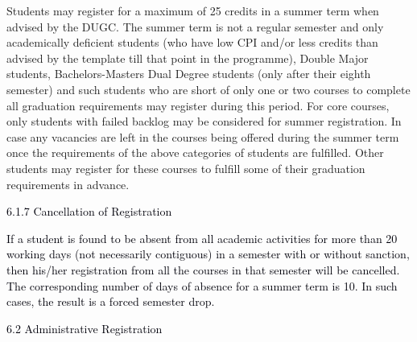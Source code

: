 \documentclass[12pt]{article}
\begin{document}
\vspace{\baselineskip}
\begin{justify}
{\fontsize{10pt}{12.0pt}\selectfont Students may register for a maximum of 25 credits in a summer term when advised by the DUGC. The summer term is not a regular semester and only academically deficient students (who have low CPI and/or less credits than advised by the template till that point in the programme), Double Major students, Bachelors-Masters Dual Degree students (only after their eighth semester) and such students who are short of only one or two courses to complete all graduation requirements may register during this period. For core courses, only students with failed backlog may be considered for summer registration. In case any vacancies are left in the courses being offered during the summer term once the requirements of the above categories of students are fulfilled. Other students may register for these courses to fulfill some of their graduation requirements in advance.\par}
\end{justify}\par


\vspace{\baselineskip}
{\fontsize{10pt}{12.0pt}\selectfont \textcolor[HTML]{00000A}{6.1.7 Cancellation of Registration}\par}\par


\vspace{\baselineskip}
\begin{adjustwidth}{0.0in}{0.01in}
\begin{justify}
{\fontsize{9pt}{10.8pt}\selectfont \textcolor[HTML]{00000A}{If a student is found to be absent from all academic activities for more than 20 working days (not necessarily contiguous) in a semester with or without sanction, then his/her registration from all the courses in that semester will be cancelled. The corresponding number of days of absence for a summer term is 10. In such cases, the result is a forced semester drop.}\par}
\end{justify}\par

\end{adjustwidth}


\vspace{\baselineskip}
\textcolor[HTML]{00000A}{6.2 Administrative Registration}\par
\end{document}
